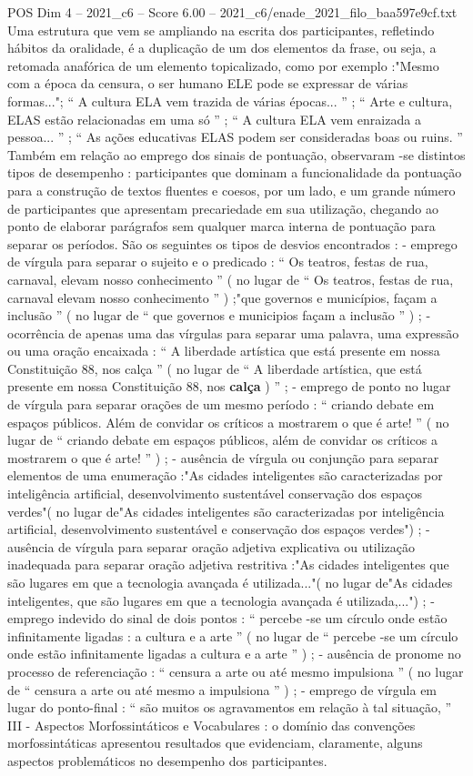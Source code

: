 \begin{textsample}{POS Dim 4 – 2021\_c6 – Score 6.00 – 2021\_c6/enade\_2021\_filo\_baa597e9cf.txt}
Uma estrutura que vem se ampliando na escrita dos participantes, refletindo hábitos da oralidade, é a duplicação de um dos elementos da frase, ou seja, a retomada anafórica de um elemento topicalizado, como por exemplo :"Mesmo com a época da censura, o ser humano ELE pode se expressar de várias formas..."; “ A cultura ELA vem trazida de várias épocas... ” ; “ Arte e cultura, ELAS estão relacionadas em uma só ” ; “ A cultura ELA vem enraizada a pessoa... ” ; “ As ações educativas ELAS podem ser consideradas boas ou ruins. ” Também em relação ao emprego dos sinais de pontuação, observaram -se distintos tipos de desempenho : participantes que dominam a funcionalidade da pontuação para a construção de textos fluentes e coesos, por um lado, e um grande número de participantes que apresentam precariedade em sua utilização, chegando ao ponto de elaborar parágrafos sem qualquer marca interna de pontuação para separar os períodos.
São os seguintes os tipos de desvios encontrados : - emprego de vírgula para separar o sujeito e o predicado : “ Os teatros, festas de rua, carnaval, elevam nosso conhecimento ” ( no lugar de “ Os teatros, festas de rua, carnaval elevam nosso conhecimento ” ) ;"que governos e municípios, façam a inclusão ” ( no lugar de “ que governos e municipios façam a inclusão ” ) ; - ocorrência de apenas uma das vírgulas para separar uma palavra, uma expressão ou uma oração encaixada : “ A liberdade artística que está presente em nossa Constituição 88, nos calça ” ( no lugar de “ A liberdade artística, que está presente em nossa Constituição 88, nos \textbf{calça} ) ” ; - emprego de ponto no lugar de vírgula para separar orações de um mesmo período : “ criando debate em espaços públicos.
Além de convidar os críticos a mostrarem o que é arte! ” ( no lugar de “ criando debate em espaços públicos, além de convidar os críticos a mostrarem o que é arte! ” ) ; - ausência de vírgula ou conjunção para separar elementos de uma enumeração :"As cidades inteligentes são caracterizadas por inteligência artificial, desenvolvimento sustentável conservação dos espaços verdes"( no lugar de"As cidades inteligentes são caracterizadas por inteligência artificial, desenvolvimento sustentável e conservação dos espaços verdes") ; - ausência de vírgula para separar oração adjetiva explicativa ou utilização inadequada para separar oração adjetiva restritiva :"As cidades inteligentes que são lugares em que a tecnologia avançada é utilizada..."( no lugar de"As cidades inteligentes, que são lugares em que a tecnologia avançada é utilizada,...") ; - emprego indevido do sinal de dois pontos : “ percebe -se um círculo onde estão infinitamente ligadas : a cultura e a arte ” ( no lugar de “ percebe -se um círculo onde estão infinitamente ligadas a cultura e a arte ” ) ; - ausência de pronome no processo de referenciação : “ censura a arte ou até mesmo impulsiona ” ( no lugar de “ censura a arte ou até mesmo a impulsiona ” ) ; - emprego de vírgula em lugar do ponto-final : “ são muitos os agravamentos em relação à tal situação, ” III - Aspectos Morfossintáticos e Vocabulares : o domínio das convenções morfossintáticas apresentou resultados que evidenciam, claramente, alguns aspectos problemáticos no desempenho dos participantes.

\end{textsample}
